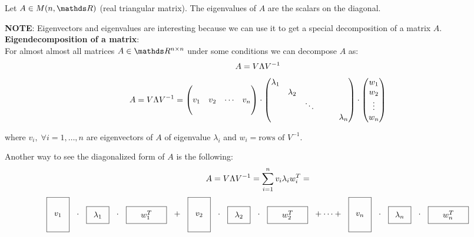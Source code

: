 \documentclass[computational_mathematics.tex]{subfiles}
\begin{document}
\begin{proposition}
  Let $A \in M(n, \R)$ (real triangular matrix). The eigenvalues of $A$ are the scalars on the diagonal.
\end{proposition}


\noindent \textbf{NOTE}: Eigenvectors and eigenvalues are interesting because we can use it to get a special decomposition of a matrix $A$.\\

\noindent \textbf{Eigendecomposition of a matrix}:\\
For almost almost all matrices $A \in \R^{n \times n}$ under some conditions we can decompose $A$ as:
 $$A = V \Lambda {V}^{-1}$$
\[
  A = V \Lambda {V}^{-1} = \begin{pmatrix}
    \\
    v_1 & v_2 & \cdots & v_n\\
    \\
  \end{pmatrix}
  \cdot 
  \begin{pmatrix}
    \lambda_1\\
    &\lambda_2\\
    && \ddots\\
    &&&&&\lambda_n\\
  \end{pmatrix}
  \cdot 
  \begin{pmatrix}
    w_1\\
    w_2\\
    \vdots\\
    w_n\\
  \end{pmatrix}
\]

where $v_i, \; \forall i=1, \ldots, n$ are eigenvectors of $A$ of eigenvalue $\lambda_i$ and $w_i = \text{rows of } V^{-1}$.\\

Another way to see the diagonalized form of $A$ is the following:
$$ A = V \Lambda {V}^{-1} = \sum\limits_{i=1}^{n} v_i\lambda_i w_i^T = $$
$$    \tallthin{$v_1$} \cdot \real{$\lambda_1$} \cdot \shortlarge{$w_1^T$} + \tallthin{$v_2$} \cdot \real{$\lambda_2$} \cdot \shortlarge{$w_2^T$} + \cdots + \tallthin{$v_n$} \cdot \real{$\lambda_n$} \cdot \shortlarge{$w_n^T$}
$$
\end{document}
